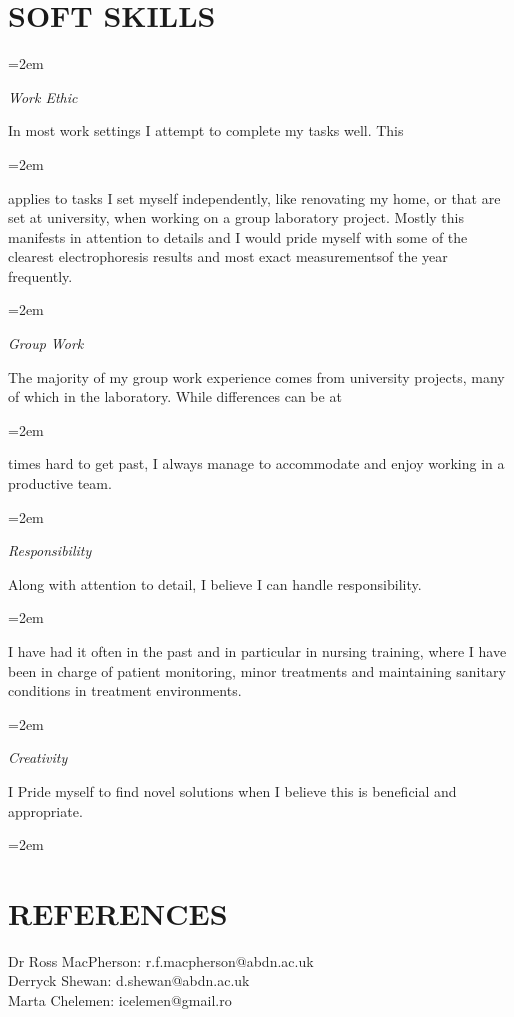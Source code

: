 \documentclass[paper=a4,fontsize=11pt]{scrartcl} %
\newlength{\spacebox}
\newcommand{\sepspace}{\vspace*{1em}}		%
\newcommand{\NewPart}[1]{\section*{\uppercase{#1}}}
\newcommand{\PersonalEntry}[2]{
		\noindent\hangindent=2em\hangafter=0 %
		\parbox{\spacebox}{        %
		\textit{#1}}		       %
		\hspace{1.5em} #2 \par}    %
\newcommand{\SkillsEntry}[2]{      %
		\noindent\hangindent=2em\hangafter=0 %
		\parbox{\spacebox}{        %
		\textit{#1}}			   %
		\hspace{1.5em} \parbox{6\spacebox}{#2} \par}    %
\begin{document}
\clearpage
\NewPart{Soft Skills}{}

\SkillsEntry{Work Ethic}{In most work settings I attempt to complete my tasks well. This }
\vspace{3pt}
\SkillsEntry{}{applies to tasks I set myself independently, like renovating my home, or that are set at university, when working on a group laboratory project. Mostly this manifests in attention to details and I would pride myself with some of the clearest electrophoresis results and most exact measurementsof the year frequently.}
\sepspace

\SkillsEntry{Group Work}{The majority of my group work experience comes from university projects, many of which in the laboratory. While differences can be at }
\vspace{3pt}
\SkillsEntry{}{times hard to get past, I always manage to accommodate and enjoy working in a productive team.}
\sepspace

\SkillsEntry{Responsibility}{Along with attention to detail, I believe I can handle responsibility. }
\vspace{3pt}
\SkillsEntry{}{I have had it often in the past and in particular in nursing training, where  I have been in charge of patient monitoring, minor treatments and maintaining sanitary conditions in treatment environments.}
\sepspace

\SkillsEntry{Creativity}{I Pride myself to find novel solutions when I believe this is beneficial and appropriate.}
\vspace{3pt}
\SkillsEntry{}{}
\sepspace

\NewPart{References}

Dr Ross MacPherson: r.f.macpherson@abdn.ac.uk \\
Derryck Shewan: d.shewan@abdn.ac.uk \\
Marta Chelemen: icelemen@gmail.ro

%

%



\end{document}
